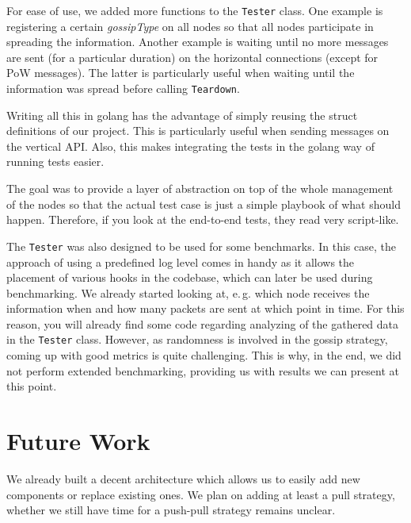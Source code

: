 \documentclass[a4paper,english,10pt,NET]{tumarticle}
\renewcommand{\eg}{\mbox{e.\,g.}\xspace} %
\begin{document}
For ease of use, we added more functions to the \texttt{Tester} class.
One example is registering a certain \emph{gossipType} on all nodes so that all nodes participate in spreading the information.
Another example is waiting until no more messages are sent (for a particular duration) on the horizontal connections (except for PoW messages).
The latter is particularly useful when waiting until the information was spread before calling \texttt{Teardown}.

Writing all this in golang has the advantage of simply reusing the struct definitions of our project.
This is particularly useful when sending messages on the vertical API.
Also, this makes integrating the tests in the golang way of running tests easier.

The goal was to provide a layer of abstraction on top of the whole management of the nodes so that the actual test case is just a simple playbook of what should happen.
Therefore, if you look at the end-to-end tests, they read very script-like.

The \texttt{Tester} was also designed to be used for some benchmarks.
In this case, the approach of using a predefined log level comes in handy as it allows the placement of various hooks in the codebase, which can later be used during benchmarking.
We already started looking at, \eg which node receives the information when and how many packets are sent at which point in time.
For this reason, you will already find some code regarding analyzing of the gathered data in the \texttt{Tester} class.
However, as randomness is involved in the gossip strategy, coming up with good metrics is quite challenging.
This is why, in the end, we did not perform extended benchmarking, providing us with results we can present at this point.

\section{Future Work} \label{sec:future}
We already built a decent architecture which allows us to easily add new components or replace existing ones.
We plan on adding at least a pull strategy, whether we still have time for a push-pull strategy remains unclear.
\end{document}
